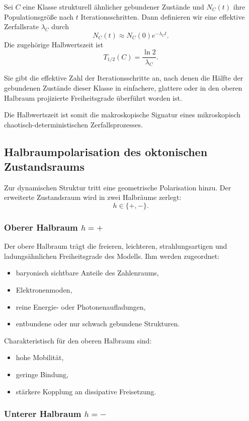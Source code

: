 \documentclass[11pt,a4paper]{article}
\theoremstyle{definition}
\begin{document}
Sei $C$ eine Klasse strukturell ähnlicher gebundener Zustände und $N_C(t)$ ihre Populationsgröße nach $t$ Iterationsschritten. Dann definieren wir eine effektive Zerfallsrate $\lambda_C$ durch
\[
N_C(t)\approx N_C(0)e^{-\lambda_C t}.
\]
Die zugehörige Halbwertszeit ist
\[
T_{1/2}(C)=\frac{\ln 2}{\lambda_C}.
\]

Sie gibt die effektive Zahl der Iterationsschritte an, nach denen die Hälfte der gebundenen Zustände dieser Klasse in einfachere, glattere oder in den oberen Halbraum projizierte Freiheitsgrade überführt worden ist.

Die Halbwertszeit ist somit die makroskopische Signatur eines mikroskopisch chaotisch-deterministischen Zerfallsprozesses.

\subsection{Halbraumpolarisation des oktonischen Zustandsraums}

Zur dynamischen Struktur tritt eine geometrische Polarisation hinzu. Der erweiterte Zustandsraum wird in zwei Halbräume zerlegt:
\[
h\in\{+,-\}.
\]

\subsubsection{Oberer Halbraum $h=+$}

Der obere Halbraum trägt die freieren, leichteren, strahlungsartigen und ladungsähnlichen Freiheitsgrade des Modells. Ihm werden zugeordnet:
\begin{itemize}
	\item baryonisch sichtbare Anteile des Zahlenraums,
	\item Elektronenmoden,
	\item reine Energie- oder Photonenaufladungen,
	\item entbundene oder nur schwach gebundene Strukturen.
\end{itemize}

Charakteristisch für den oberen Halbraum sind:
\begin{itemize}
	\item hohe Mobilität,
	\item geringe Bindung,
	\item stärkere Kopplung an dissipative Freisetzung.
\end{itemize}

\subsubsection{Unterer Halbraum $h=-$}
\end{document}
